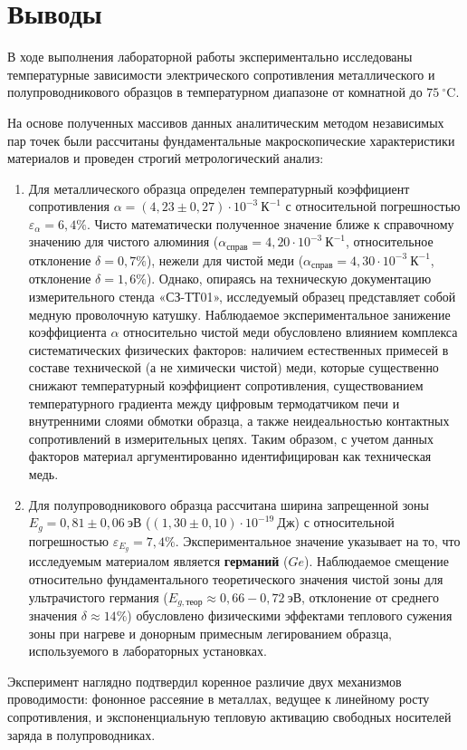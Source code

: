 \documentclass[12pt]{article}
\begin{document}
\newpage
\section{Выводы}
В ходе выполнения лабораторной работы экспериментально исследованы температурные зависимости электрического сопротивления металлического и полупроводникового образцов в температурном диапазоне от комнатной до $75~^{\circ}\text{C}$.

На основе полученных массивов данных аналитическим методом независимых пар точек были рассчитаны фундаментальные макроскопические характеристики материалов и проведен строгий метрологический анализ:
\begin{enumerate}
    \item Для металлического образца определен температурный коэффициент сопротивления $\alpha = (4{,}23 \pm 0{,}27) \cdot 10^{-3}~\text{К}^{-1}$ с относительной погрешностью $\varepsilon_\alpha = 6{,}4\%$. Чисто математически полученное значение ближе к справочному значению для чистого алюминия ($\alpha_{\text{справ}} = 4{,}20 \cdot 10^{-3}~\text{К}^{-1}$, относительное отклонение $\delta = 0{,}7\%$), нежели для чистой меди ($\alpha_{\text{справ}} = 4{,}30 \cdot 10^{-3}~\text{К}^{-1}$, отклонение $\delta = 1{,}6\%$). 
    Однако, опираясь на техническую документацию измерительного стенда «СЗ-ТТ01», исследуемый образец представляет собой медную проволочную катушку. Наблюдаемое экспериментальное занижение коэффициента $\alpha$ относительно чистой меди обусловлено влиянием комплекса систематических физических факторов: наличием естественных примесей в составе технической (а не химически чистой) меди, которые существенно снижают температурный коэффициент сопротивления, существованием температурного градиента между цифровым термодатчиком печи и внутренними слоями обмотки образца, а также неидеальностью контактных сопротивлений в измерительных цепях. Таким образом, с учетом данных факторов материал аргументированно идентифицирован как техническая медь.
    \item Для полупроводникового образца рассчитана ширина запрещенной зоны $E_g = 0{,}81 \pm 0{,}06~\text{эВ}$ ($(1{,}30 \pm 0{,}10) \cdot 10^{-19}~\text{Дж}$) с относительной погрешностью $\varepsilon_{E_g} = 7{,}4\%$. Экспериментальное значение указывает на то, что исследуемым материалом является \textbf{германий} ($Ge$). Наблюдаемое смещение относительно фундаментального теоретического значения чистой зоны для ультрачистого германия ($E_{g,\text{теор}} \approx 0{,}66{-}0{,}72~\text{эВ}$, отклонение от среднего значения $\delta \approx 14\%$) обусловлено физическими эффектами теплового сужения зоны при нагреве и донорным примесным легированием образца, используемого в лабораторных установках.
\end{enumerate}
Эксперимент наглядно подтвердил коренное различие двух механизмов проводимости: фононное рассеяние в металлах, ведущее к линейному росту сопротивления, и экспоненциальную тепловую активацию свободных носителей заряда в полупроводниках.
\end{document}
